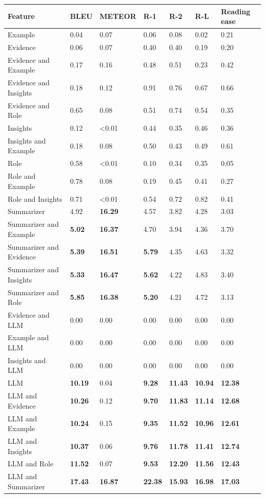 \begin{tabular}{|l|l|l|l|l|l|l|}
\hline
\textbf{Feature} & BLEU & METEOR & R-1 & R-2 & R-L & Reading ease \\
 \hline
 Example & 0.04 & 0.07 & 0.06 & 0.08 & 0.02 & 0.21 \\
 \hline
 Evidence & 0.06 & 0.07 & 0.40 & 0.40 & 0.19 & 0.20 \\
 \hline
 Evidence and Example & 0.17 & 0.16 & 0.48 & 0.51 & 0.23 & 0.42 \\
 \hline
 Evidence and Insights & 0.18 & 0.12 & 0.91 & 0.76 & 0.67 & 0.66 \\
 \hline
 Evidence and Role & 0.65 & 0.08 & 0.51 & 0.74 & 0.54 & 0.35 \\
 \hline
 Insights & 0.12 & \textless{}0.01 & 0.44 & 0.35 & 0.46 & 0.36 \\
 \hline
 Insights and Example & 0.18 & 0.08 & 0.50 & 0.43 & 0.49 & 0.61 \\
 \hline
 Role & 0.58 & \textless{}0.01 & 0.10 & 0.34 & 0.35 & 0.05 \\
 \hline
 Role and Example & 0.78 & 0.08 & 0.19 & 0.45 & 0.41 & 0.27 \\
 \hline
 Role and Insights & 0.71 & \textless{}0.01 & 0.54 & 0.72 & 0.82 & 0.41 \\
 \hline
 Summarizer & 4.92 & \textbf{16.29} & 4.57 & 3.82 & 4.28 & 3.03 \\
 \hline
 Summarizer and Example & \textbf{5.02} & \textbf{16.37} & 4.70 & 3.94 & 4.36 & 3.70 \\
 \hline
 Summarizer and Evidence & \textbf{5.39} & \textbf{16.51} & \textbf{5.79} & 4.35 & 4.63 & 3.32 \\
 \hline
 Summarizer and Insights & \textbf{5.33} & \textbf{16.47} & \textbf{5.62} & 4.22 & 4.83 & 3.40 \\
 \hline
 Summarizer and Role & \textbf{5.85} & \textbf{16.38} & \textbf{5.20} & 4.21 & 4.72 & 3.13 \\
 \hline
 Evidence and LLM & 0.00 & 0.00 & 0.00 & 0.00 & 0.00 & 0.00 \\
 \hline
 Example and LLM & 0.00 & 0.00 & 0.00 & 0.00 & 0.00 & 0.00 \\
 \hline
 Insights and LLM & 0.00 & 0.00 & 0.00 & 0.00 & 0.00 & 0.00 \\
 \hline
 LLM & \textbf{10.19} & 0.04 & \textbf{9.28} & \textbf{11.43} & \textbf{10.94} & \textbf{12.38} \\
 \hline
 LLM and Evidence & \textbf{10.26} & 0.12 & \textbf{9.70} & \textbf{11.83} & \textbf{11.14} & \textbf{12.68} \\
 \hline
 LLM and Example & \textbf{10.24} & 0.15 & \textbf{9.35} & \textbf{11.52} & \textbf{10.96} & \textbf{12.61} \\
 \hline
 LLM and Insights & \textbf{10.37} & 0.06 & \textbf{9.76} & \textbf{11.78} & \textbf{11.41} & \textbf{12.74} \\
 \hline
 LLM and Role & \textbf{11.52} & 0.07 & \textbf{9.53} & \textbf{12.20} & \textbf{11.56} & \textbf{12.43} \\
 \hline
 LLM and Summarizer & \textbf{17.43} & \textbf{16.87} & \textbf{22.38} & \textbf{15.93} & \textbf{16.98} & \textbf{17.03} \\
\hline
\end{tabular}
